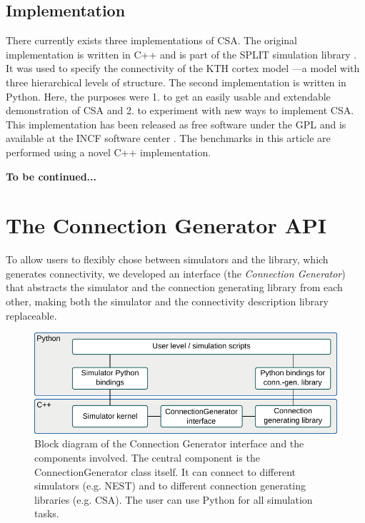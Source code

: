 \documentclass{frontiersSCNS} %
\newcommand{\tbw}[1]{{\bf\parindent0pt\color{red}#1}}
\begin{document}
\subsection{Implementation}\label{sec:impl}

There currently exists three implementations of CSA.  The original
implementation is written in C++ and is part of the SPLIT simulation
library \citep{djurfeldt05}.  It was used to specify the connectivity
of the KTH cortex model \citep{djurfeldt08}---a model with three
hierarchical levels of structure.  The second implementation is
written in Python.  Here, the purposes were 1. to get an easily usable
and extendable demonstration of CSA and 2. to experiment with new ways
to implement CSA. This implementation has been released as free
software under the GPL and is available at the INCF software center
\citep{djurfeldt10}.  The benchmarks in this article are performed
using a novel C++ implementation.

\tbw{To be continued...}


\section{The Connection Generator API}

To allow users to flexibly chose between simulators and the library,
which generates connectivity, we developed an interface (the
\emph{Connection Generator}) that abstracts the simulator and the
connection generating library from each other, making both the
simulator and the connectivity description library replaceable.

\begin{figure}[ht]
\centering
\includegraphics[scale=.8]{figures/block_diagram_conngen.pdf}
\caption{Block diagram of the Connection Generator interface and the
  components involved. The central component is the
  ConnectionGenerator class itself. It can connect to different simulators
  (e.g. NEST) and to different connection generating libraries
  (e.g. CSA). The user can use Python for all simulation
  tasks.}\label{fig:block_diagram_conngen}
\end{figure}
\end{document}
